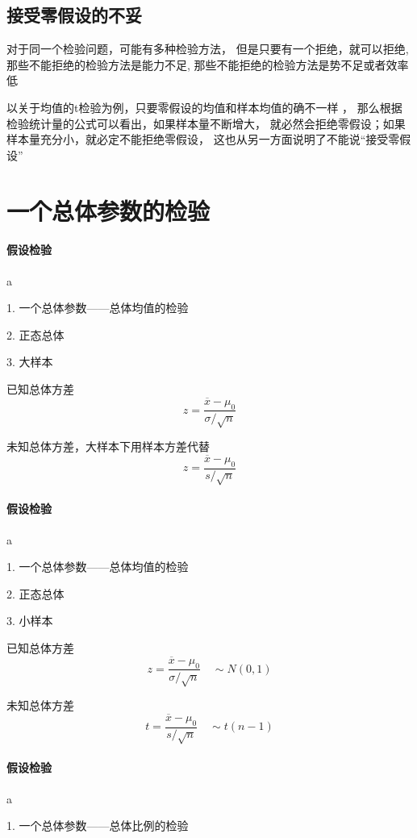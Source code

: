 \documentclass[UTF8,10pt]{book}
\begin{document}
{        \subsection{接受零假设的不妥}	
        对于同一个检验问题，可能有多种检验方法，
        但是只要有一个拒绝，就可以拒绝,
        那些不能拒绝的检验方法是能力不足,
        那些不能拒绝的检验方法是势不足或者效率低

        {\kaishu 以关于均值的t检验为例，只要零假设的均值和样本均值的确不一样	，
        那么根据检验统计量的公式可以看出，如果样本量不断增大，
        就必然会拒绝零假设；如果样本量充分小，就必定不能拒绝零假设，
        这也从另一方面说明了不能说“接受零假设”}
    \section{一个总体参数的检验}
        \paragraph{假设检验} a
        
        1. 一个总体参数——总体均值的检验 

        2. 正态总体 

        3. 大样本	
        
        已知总体方差 $$ z = \frac{\overline{x}-\mu_0}{\sigma / \sqrt{n}} $$ 

        未知总体方差，大样本下用样本方差代替 $$ z = \frac{\overline{x}-\mu_0}{s / \sqrt{n}} $$

        \paragraph{假设检验} a
        
        1. 一个总体参数——总体均值的检验 
        
        2. 正态总体 
        
        3. 小样本	
        
        已知总体方差 $$ z = \frac{\overline{x}-\mu_0}{\sigma / \sqrt{n}} \quad \sim N(0,1)$$ 
        
        未知总体方差 $$ t = \frac{\overline{x}-\mu_0}{s / \sqrt{n}} \quad \sim t(n-1) $$
        
        \paragraph{假设检验} a
        
        1. 一个总体参数——总体比例的检验 
        
}
\end{document}
